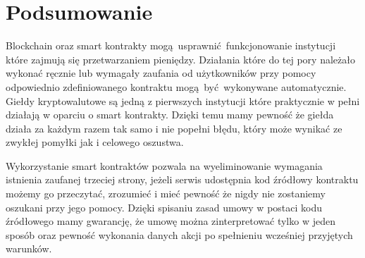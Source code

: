 \documentclass[]{llncs}
\renewcommand{\cite}[1]{~\oldcite{#1}}
\begin{document}


\section{Podsumowanie}

  Blockchain oraz smart kontrakty mogą usprawnić funkcjonowanie instytucji które
  zajmują się przetwarzaniem pieniędzy. Działania które do tej pory należało
  wykonać ręcznie lub wymagały zaufania od użytkowników przy pomocy odpowiednio
  zdefiniowanego kontraktu mogą być wykonywane automatycznie. Giełdy
  kryptowalutowe są jedną z pierwszych instytucji które praktycznie w pełni
  działają w oparciu o smart kontrakty. Dzięki temu mamy pewność że giełda
  działa za każdym razem tak samo i nie popełni błędu, który może wynikać ze
  zwykłej pomyłki jak i celowego oszustwa.

  Wykorzystanie smart kontraktów pozwala na wyeliminowanie wymagania istnienia
  zaufanej trzeciej strony, jeżeli serwis udostępnia kod źródłowy kontraktu
  możemy go przeczytać, zrozumieć i mieć pewność że nigdy nie zostaniemy
  oszukani przy jego pomocy. Dzięki spisaniu zasad umowy w postaci kodu
  źródłowego mamy gwarancję, że umowę można zinterpretować tylko w jeden sposób
  oraz pewność wykonania danych akcji po spełnieniu wcześniej przyjętych
  warunków.

\printbibliography
\end{document}
